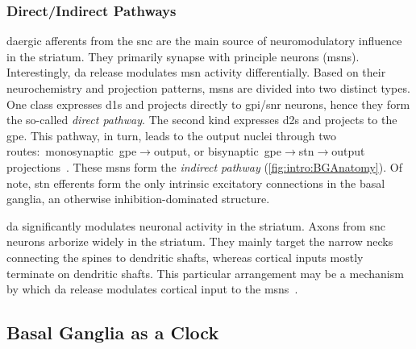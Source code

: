 \subsubsection{Direct/Indirect Pathways}
\label{intro:bg:pathways}
\Gls{da}ergic afferents from the \gls{snc} are the main source of neuromodulatory influence in the striatum.
They primarily synapse with principle neurons (\glspl{msn}).
Interestingly, \gls{da} release modulates \gls{msn} activity differentially.
Based on their neurochemistry and projection patterns, \glspl{msn} are divided into two distinct types.
One class expresses \glspl{d1} and projects directly to \gls{gpi}/\gls{snr} neurons, hence they form the so-called \emph{direct pathway}.
The second kind expresses \glspl{d2} and projects to the \gls{gpe}.
This pathway, in turn, leads to the output nuclei through two routes:~monosynaptic~\gls{gpe}$\rightarrow$output, or bisynaptic~\gls{gpe}$\rightarrow$\gls{stn}$\rightarrow$output projections~\cite{TURNER2000BasalFunction}.
These \glspl{msn} form the \emph{indirect pathway} (\autoref{fig:intro:BGAnatomy}).
Of note, \gls{stn} efferents form the only intrinsic excitatory connections in the basal ganglia, an otherwise inhibition-dominated structure.
\par
\Gls{da} significantly modulates neuronal activity in the striatum.
Axons from \gls{snc} neurons arborize widely in the striatum.
They mainly target the narrow necks connecting the spines to dendritic shafts, whereas cortical inputs mostly terminate on dendritic shafts.
This particular arrangement may be a mechanism by which \gls{da} release modulates cortical input to the \glspl{msn}~\cite{TURNER2000BasalFunction}.


\subsection{Basal Ganglia as a Clock}
\label{ch:intro:BGTime}

